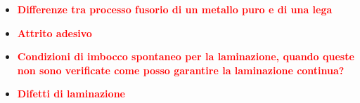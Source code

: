 \documentclass[a4paper, 15pt]{article}
\begin{document}
\begin{itemize}
		
		
		
		
\item
		\textcolor{red}{\textbf{Differenze tra processo fusorio di un metallo puro e di una lega}}\\
		
		
		
		
		
\item
		\textcolor{red}{\textbf{Attrito adesivo}}\\
		
		
		
		
		
\item
		\textcolor{red}{\textbf{Condizioni di imbocco spontaneo per la laminazione,  quando queste non sono verificate come posso garantire la laminazione continua?}}\\
			
			
			
			
			
\item
			\textcolor{red}{\textbf{Difetti di laminazione}}\\
				
				
				

\end{itemize}
\end{document}
